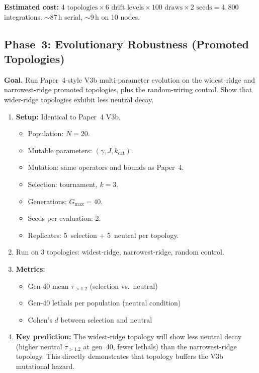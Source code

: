 \documentclass[aps,prl,twocolumn,superscriptaddress,floatfix]{revtex4-2}
\newcommand{\tauexp}{\tau_{>1.2}}
\newcommand{\kcat}{k_{\mathrm{cat}}}
\begin{document}
\textbf{Estimated cost:}
$4 \text{ topologies} \times 6 \text{ drift levels} \times
100 \text{ draws} \times 2 \text{ seeds} = 4{,}800$ integrations.
$\sim$87\,h serial, $\sim$9\,h on 10 nodes.

\subsection{Phase~3: Evolutionary Robustness (Promoted Topologies)}
\label{sec:phase3}

\textbf{Goal.}  Run Paper~4-style V3b multi-parameter evolution
on the widest-ridge and narrowest-ridge promoted topologies, plus
the random-wiring control.  Show that wider-ridge topologies
exhibit less neutral decay.

\begin{enumerate}[label=3.\arabic*]
  \item \textbf{Setup:}  Identical to Paper~4 V3b.
    \begin{itemize}
      \item Population: $N = 20$.
      \item Mutable parameters: $(\gamma, J, \kcat)$.
      \item Mutation: same operators and bounds as Paper~4.
      \item Selection: tournament, $k = 3$.
      \item Generations: $G_{\max} = 40$.
      \item Seeds per evaluation: 2.
      \item Replicates: 5~selection $+$ 5~neutral per topology.
    \end{itemize}

  \item Run on 3 topologies: widest-ridge, narrowest-ridge,
    random control.

  \item \textbf{Metrics:}
    \begin{itemize}
      \item Gen-40 mean $\tauexp$ (selection vs.\ neutral)
      \item Gen-40 lethals per population (neutral condition)
      \item Cohen's $d$ between selection and neutral
    \end{itemize}

  \item \textbf{Key prediction:}  The widest-ridge topology
    will show less neutral decay (higher neutral $\tauexp$
    at gen~40, fewer lethals) than the narrowest-ridge topology.
    This directly demonstrates that topology buffers the V3b
    mutational hazard.
\end{enumerate}
\end{document}
